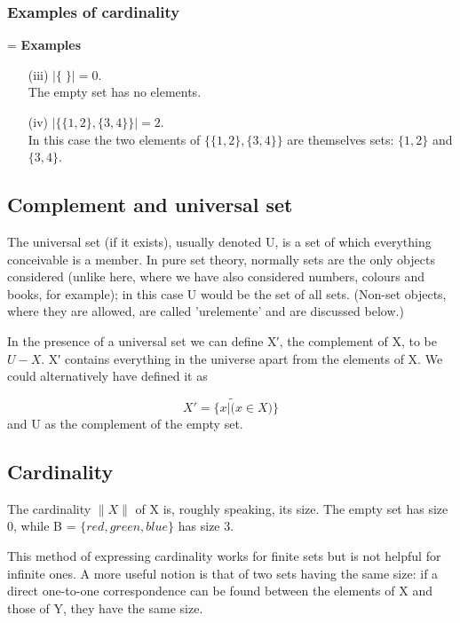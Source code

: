 \documentclass[]{report}
\begin{document}
\begin{frame}
	\frametitle{Examples of cardinality}
=
	\textbf{Examples}
	\begin{itemize}
		\item[(iii)] $|\{ \; \}| = 0$. \\ The empty set has no elements.
		\vspace{0.4cm} 
		\item[(iv)] $|\{\{1,2\},\{3,4\}\}| = 2$. \\ \vspace{0.4cm} In this case the two elements of $\{\{1,2\},\{3,4\}\}$ are themselves sets: $\{1,2\}$ and $\{3,4\}$.
	\end{itemize}
\end{frame}

\subsection{Complement and universal set}

The universal set (if it exists), usually denoted U, is a set of which everything conceivable is a member. In pure set theory, normally sets are the only objects considered (unlike here, where we have also considered numbers, colours and books, for example); in this case U would be the set of all sets. (Non-set objects, where they are allowed, are called 'urelemente' and are discussed below.)

In the presence of a universal set we can define X′, the complement of X, to be $U−X$. X′ contains everything in the universe apart from the elements of X. We could alternatively have defined it as

\[X′ = \{x | \tilde (x\in X)\}\]
and U as the complement of the empty set.

\subsection{Cardinality}

The cardinality $\|X\|$ of X is, roughly speaking, its size. The empty set has size 0, while B = $\{red, green, blue\}$ has size 3. 

This method of expressing cardinality works for finite sets but is not helpful for infinite ones. A more useful notion is that of two sets having the same size: if a direct one-to-one correspondence can be found between the elements of X and those of Y, they have the same size. 
\end{document}
